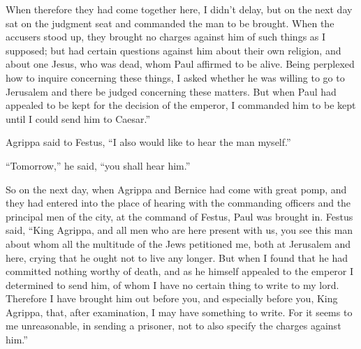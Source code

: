 {When therefore they had come together here, I didn’t delay, but on the next day sat on the judgment seat and commanded the man to be brought.
When the accusers stood up, they brought no charges against him of such things as I supposed;
but had certain questions against him about their own religion, and about one Jesus, who was dead, whom Paul affirmed to be alive.
Being perplexed how to inquire concerning these things, I asked whether he was willing to go to Jerusalem and there be judged concerning these matters.
But when Paul had appealed to be kept for the decision of the emperor, I commanded him to be kept until I could send him to Caesar.”
\par }{\PP {}Agrippa said to Festus, “I also would like to hear the man myself.”
\par }{\PP “Tomorrow,” he said, “you shall hear him.”
\par }{\PP {}So on the next day, when Agrippa and Bernice had come with great pomp, and they had entered into the place of hearing with the commanding officers and the principal men of the city, at the command of Festus, Paul was brought in.
Festus said, “King Agrippa, and all men who are here present with us, you see this man about whom all the multitude of the Jews petitioned me, both at Jerusalem and here, crying that he ought not to live any longer.
But when I found that he had committed nothing worthy of death, and as he himself appealed to the emperor I determined to send him,
of whom I have no certain thing to write to my lord. Therefore I have brought him out before you, and especially before you, King Agrippa, that, after examination, I may have something to write.
For it seems to me unreasonable, in sending a prisoner, not to also specify the charges against him.”

}
